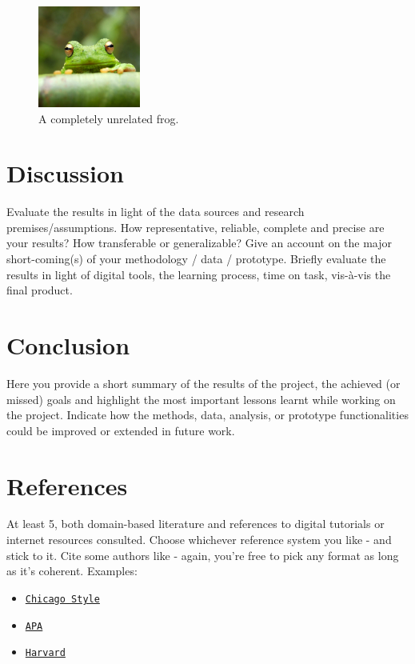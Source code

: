 \documentclass{article}
\begin{document}
\begin{figure}[t]
    \centering
    \includegraphics[width=0.3\textwidth]{frog.jpg}
    \caption{A completely unrelated frog.}
    \label{fig01}
\end{figure}

\section{Discussion}
Evaluate the results in light of the data sources and research premises/assumptions. How representative, reliable, complete and precise are your results? How transferable or generalizable? Give an account on the major short-coming(s) of your methodology / data / prototype. Briefly evaluate the results in light of digital tools, the learning process, time on task, vis-à-vis the final product.

\section{Conclusion}
Here you provide a short summary of the results of the project, the achieved (or missed) goals and highlight the most important lessons learnt while working on the project. Indicate how the methods, data, analysis, or prototype functionalities could be improved or extended in future work.

\section{References}
At least 5, both domain-based literature and references to digital tutorials or internet resources consulted. Choose whichever reference system you like - and stick to it. Cite some authors like \cite{greenwade93} - again, you're free to pick any format as long as it's coherent.
Examples:

\begin{itemize}

\item \texttt{\href{https://www.chicagomanualofstyle.org/tools\_citationguide.html}{Chicago Style}}
\item \texttt{\href{https://www.mendeley.com/guides/apa-citation-guide/}{APA}}
\item \texttt{\href{https://www.mendeley.com/guides/harvard-citation-guide/}{Harvard}}

\end{itemize}
\end{document}
